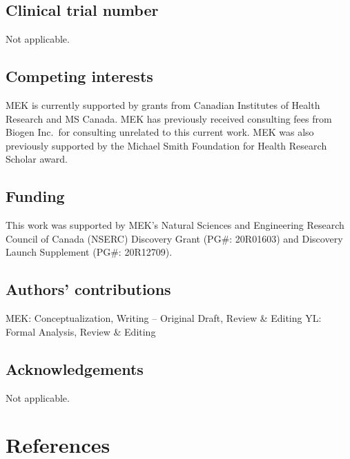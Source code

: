\documentclass[10pt,letterpaper]{article}
\begin{document}
\subsection*{Clinical trial number}\label{clinical-trial-number}

Not applicable.

\subsection*{Competing interests}\label{competing-interests}

MEK is currently supported by grants from Canadian Institutes of Health
Research and MS Canada. MEK has previously received consulting fees from
Biogen Inc.~for consulting unrelated to this current work. MEK was also
previously supported by the Michael Smith Foundation for Health Research
Scholar award.

\subsection*{Funding}\label{funding}

This work was supported by MEK's Natural Sciences and Engineering
Research Council of Canada (NSERC) Discovery Grant (PG\#: 20R01603) and
Discovery Launch Supplement (PG\#: 20R12709).

\subsection*{Authors' contributions}\label{authors-contributions}

MEK: Conceptualization, Writing -- Original Draft, Review \& Editing YL:
Formal Analysis, Review \& Editing

\subsection*{Acknowledgements}\label{acknowledgements}

Not applicable.

\section*{References}\label{references}
\end{document}
